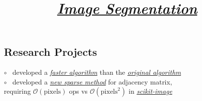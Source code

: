 \documentclass[12pt,margintitle,line]{res}
\begin{document}
\begin{resume}
\vspace{-1.2cm}

\section{Research Projects}

\vspace{-0.5cm}
\title{
\href{https://github.com/Will-Wright/image-segmentation} {\textsl{Image Segmentation}}
}
\employer{ 
}
\dates{}
\begin{position}

	\begin{figure} 
		\vspace{-0.90cm}
		\hspace{-1.95cm}
 	 	\begin{minipage}[t]{3cm}
  		\end{minipage} 
	\end{figure} 
	
\vspace{-1.25cm}
$\circ$ \ developed a
\href{https://github.com/Will-Wright/image-segmentation#demo-tutorial} {\textsl{faster algorithm}}
than the 
\href{http://www1.maths.lth.se/matematiklth/vision/publdb/reports/pdf/eriksson-olsson-etal-jmiv-10.pdf} {\textsl{original algorithm}}
	\\
$\circ$ \ developed a
\href{https://github.com/Will-Wright/image-segmentation/blob/master/src/GetAdjMat.py}{\textit{new sparse method}} 
for adjacency matrix,
	\\		\hspace*{0.35cm} 
requiring $\mathcal{O}(\text{pixels})$ ops vs $\mathcal{O}(\text{pixels}^2)$ in
\href{https://github.com/scikit-image/scikit-image/blob/master/skimage/future/graph/rag.py}{\textit{scikit-image}} 
\end{position}





\end{resume}
\end{document}

